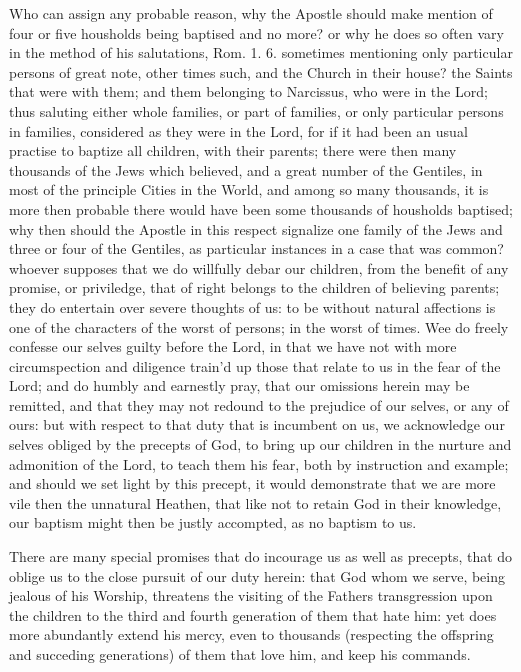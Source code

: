 \documentclass[12pt,a4paper]{book}
\begin{document}
Who can assign any probable reason, why the Apostle should make mention of four or five housholds being baptised and no more? or why he does so often vary in the method of his salutations, Rom. 1. 6. sometimes mentioning only particular persons of great note, other times such, and the Church in their house? the Saints that were with them; and them belonging to Narcissus, who were in the Lord; thus saluting either whole families, or part of families, or only particular persons in families, considered as they were in the Lord, for if it had been an usual practise to baptize all children, with their parents; there were then many thousands of the Jews which believed, and a great number of the Gentiles, in most of the principle Cities in the World, and among so many thousands, it is more then probable there would have been some thousands of housholds baptised; why then should the Apostle in this respect signalize one family of the Jews and three or four of the Gentiles, as particular instances in a case that was common? whoever supposes that we do willfully debar our children, from the benefit of any promise, or priviledge, that of right belongs to the children of believing parents; they do entertain over severe thoughts of us: to be without natural affections is one of the characters of the worst of persons; in the worst of times. Wee do freely confesse our selves guilty before the Lord, in that we have not with more circumspection and diligence train'd up those that relate to us in the fear of the Lord; and do humbly and earnestly pray, that our omissions herein may be remitted, and that they may not redound to the prejudice of our selves, or any of ours: but with respect to that duty that is incumbent on us, we acknowledge our selves obliged by the precepts of God, to bring up our children in the nurture and admonition of the Lord, to teach them his fear, both by instruction and example; and should we set light by this precept, it would demonstrate that we are more vile then the unnatural Heathen, that like not to retain God in their knowledge, our baptism might then be justly accompted, as no baptism to us.

There are many special promises that do incourage us as well as precepts, that do oblige us to the close pursuit of our duty herein: that God whom we serve, being jealous of his Worship, threatens the visiting of the Fathers transgression upon the children to the third and fourth generation of them that hate him: yet does more abundantly extend his mercy, even to thousands (respecting the offspring and succeding generations) of them that love him, and keep his commands.
\end{document}
